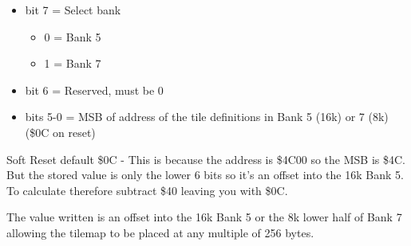 \begin{itemize}
\item bit 7 = Select bank
\begin{itemize}
\item[] 0 = Bank 5
\item[] 1 = Bank 7
\end{itemize}
\item bit 6 = Reserved, must be 0
\item bits 5-0 = MSB of address of the tile definitions in Bank 5 (16k) or 7
(8k) (\$0C on reset)
\end{itemize}
Soft Reset default \$0C - This is because the address is \$4C00 so the
MSB is \$4C. But the stored value is only the lower 6 bits so it's an
offset into the 16k Bank 5. To calculate therefore subtract \$40
leaving you with \$0C.

The value written is an offset into the 16k Bank 5 or the 8k lower
half of Bank 7 allowing the tilemap to be placed at any multiple of
256 bytes.
